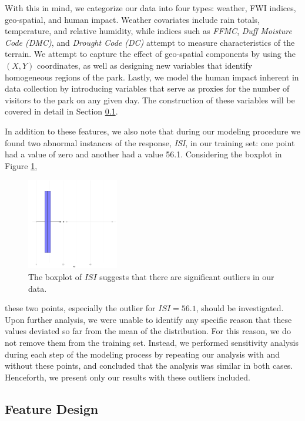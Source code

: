 \documentclass{article}
\begin{document}
With this in mind, we categorize our data into four types: weather, FWI indices, geo-spatial, and human impact. Weather covariates include rain totals, temperature, and relative humidity, while indices such as \textit{FFMC}, \textit{Duff Moisture Code (DMC)}, and \textit{Drought Code (DC)} attempt to measure characteristics of the terrain. We attempt to capture the effect of geo-spatial components by using the $(X,Y)$ coordinates, as well as designing new variables that identify homogeneous regions of the park. Lastly, we model the human impact inherent in data collection by introducing variables that serve as proxies for the number of visitors to the park on any given day. The construction of these variables will be covered in detail in Section \ref{Engineering}.

In addition to these features, we also note that during our modeling procedure we found two abnormal instances of the response, \textit{ISI}, in our training set: one point had a value of zero and another had a value 56.1. Considering the boxplot in Figure \ref{fig:ISI_outlier},
\begin{figure}[h!]
\centering
\includegraphics[width = .5\textwidth, height = 4cm]{ISI_box.pdf}
\caption{The boxplot of $ISI$ suggests that there are significant outliers in our data.}
\label{fig:ISI_outlier}{}
\end{figure}
these two points, especially the outlier for $\textit{ISI} = 56.1$, should be investigated. Upon further analysis, we were unable to identify any specific reason that these values deviated so far from the mean of the distribution. For this reason, we do not remove them from the training set. Instead, we performed sensitivity analysis during each step of the modeling process by repeating our analysis with and without these points, and concluded that the analysis was similar in both cases. Henceforth, we present only our results with these outliers included.

\subsection{Feature Design}\label{Engineering}
\end{document}
